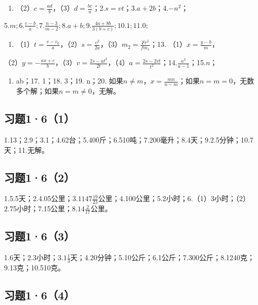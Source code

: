 \begin{enumerate}
\item
  （2）\(c = \frac{ad}{b}\)，（3）\(d = \frac{bc}{a}\)；2.\(s = vt\)；3.\(a + 2b\)；4.\(-n^2\)；
\end{enumerate}

5.\(m; 6. \frac{c - b}{a}; 7. \frac{n - 3}{m - 2}; 8. a + b; 9. \frac{4a + 8b}{3(b + c)}; 10.1; 11.0;\)

\begin{enumerate}[start=12]
\item
  （1）\(t = \frac{v - v_0}{a}\)，（2）\(s = \frac{v^2}{2a}\)，（3）\(m_2 = \frac{Fr^2}{fm_1}\)；13.
  （1）\(x = \frac{y - b}{m}\)，
\end{enumerate}

（2）\(y = -\frac{ax + c}{b}\)，（3）\(v = \frac{2s - a t^2}{2t}\)，（4）\(a = \frac{2s - 2vt}{t^2}\)；14.\(\frac{a^2}{a - 1}\)；15.\(n\)；

\begin{enumerate}[start=16]
\item
  ab；17. 1；18. 3；19. n；20.
  如果\(n \neq m\)，\(x = \frac{mn}{n - m}\)；如果\(n = m = 0\)，无数多个解；如果\(n = m \neq 0\)，无解。
\end{enumerate}

\subsection{习题1·6（1）}

1.13；2.9；3.1；4.62台；5.400斤；6.510吨；7.200毫升；8.4天；9.2.5分钟；10.7天；11.无解。

\subsection{习题1·6（2）}

1.5.5天；2.4.05公里；3.\(1147\frac{19}{23}\)公里；4.100公里；5.2小时；6.（1）3小时；（2）2.75小时；7.15公里；8.\(14\frac{2}{17}\)公里。

\subsection{习题1·6（3）}

1.6天；2.3小时；3.\(1\frac{1}{3}\)天；4.20分钟；5.10公斤；6.1公斤；7.300公斤；8.1240克；9.13克；10.510克。

\subsection{习题1·6（4）}


